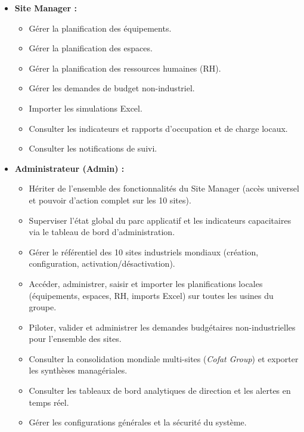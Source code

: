 \begin{itemize}
    \item \textbf{Site Manager :}
    \begin{itemize}
        \item Gérer la planification des équipements.
        \item Gérer la planification des espaces.
        \item Gérer la planification des ressources humaines (RH).
        \item Gérer les demandes de budget non-industriel.
        \item Importer les simulations Excel.
        \item Consulter les indicateurs et rapports d'occupation et de charge locaux.
        \item Consulter les notifications de suivi.
    \end{itemize}
    
    \item \textbf{Administrateur (Admin) :}
    \begin{itemize}
        \item Hériter de l'ensemble des fonctionnalités du Site Manager (accès universel et pouvoir d'action complet sur les 10 sites).
        \item Superviser l'état global du parc applicatif et les indicateurs capacitaires via le tableau de bord d'administration.
        \item Gérer le référentiel des 10 sites industriels mondiaux (création, configuration, activation/désactivation).
        \item Accéder, administrer, saisir et importer les planifications locales (équipements, espaces, RH, imports Excel) sur toutes les usines du groupe.
        \item Piloter, valider et administrer les demandes budgétaires non-industrielles pour l'ensemble des sites.
        \item Consulter la consolidation mondiale multi-sites (\textit{Cofat Group}) et exporter les synthèses managériales.
        \item Consulter les tableaux de bord analytiques de direction et les alertes en temps réel.
        \item Gérer les configurations générales et la sécurité du système.
    \end{itemize}
    

\end{itemize}
